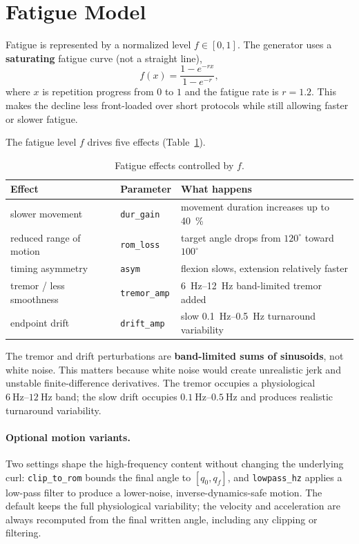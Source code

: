 \documentclass[11pt]{article}
\newcommand{\dg}{^{\circ}}
\begin{document}
\section{Fatigue Model}
\label{sec:fatigue}

Fatigue is represented by a normalized level $f \in [0,1]$. The generator uses a
\textbf{saturating} fatigue curve (not a straight line),
\begin{equation}
f(x) = \frac{1 - e^{-r x}}{1 - e^{-r}},
\end{equation}
where $x$ is repetition progress from $0$ to $1$ and the fatigue rate is
$r = 1.2$. This makes the decline less front-loaded over short protocols while
still allowing faster or slower fatigue.

The fatigue level $f$ drives five effects (Table~\ref{tab:fatigue}).

\begin{table}[h]
\centering
\begin{tabular}{lll}
\toprule
\textbf{Effect} & \textbf{Parameter} & \textbf{What happens} \\
\midrule
slower movement & \texttt{dur\_gain} & movement duration increases up to \SI{40}{\percent} \\
reduced range of motion & \texttt{rom\_loss} & target angle drops from $120\dg$ toward $100\dg$ \\
timing asymmetry & \texttt{asym} & flexion slows, extension relatively faster \\
tremor / less smoothness & \texttt{tremor\_amp} & \SIrange{6}{12}{\hertz} band-limited tremor added \\
endpoint drift & \texttt{drift\_amp} & slow \SIrange{0.1}{0.5}{\hertz} turnaround variability \\
\bottomrule
\end{tabular}
\caption{Fatigue effects controlled by $f$.}
\label{tab:fatigue}
\end{table}

\noindent
The tremor and drift perturbations are \textbf{band-limited sums of sinusoids},
not white noise. This matters because white noise would create unrealistic jerk
and unstable finite-difference derivatives. The tremor occupies a physiological
$\SIrange{6}{12}{\hertz}$ band; the slow drift occupies $\SIrange{0.1}{0.5}{\hertz}$
and produces realistic turnaround variability.

\paragraph{Optional motion variants.}
Two settings shape the high-frequency content without changing the underlying
curl: \texttt{clip\_to\_rom} bounds the final angle to $[q_0, q_f]$, and
\texttt{lowpass\_hz} applies a low-pass filter to produce a lower-noise,
inverse-dynamics-safe motion. The default keeps the full physiological
variability; the velocity and acceleration are always recomputed from the final
written angle, including any clipping or filtering.
\end{document}
